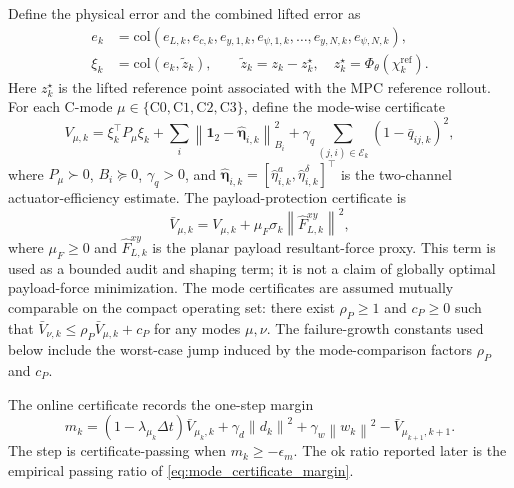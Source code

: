 \documentclass[twocolumn,3p,times,procedia]{elsarticle}
\newcommand{\norm}[1]{\left\lVert #1 \right\rVert}
\begin{document}
Define the physical error and the combined lifted error as
\begin{equation}
\begin{aligned}
e_k&=\mathrm{col}\left(e_{L,k},e_{c,k},e_{y,1,k},e_{\psi,1,k},\ldots,e_{y,N,k},e_{\psi,N,k}\right),\\
\xi_k&=\mathrm{col}\left(e_k,\tilde z_k\right),
\qquad
\tilde z_k=z_k-z_k^\star,\quad
z_k^\star=\Phi_\theta(\chi_k^{\mathrm{ref}}).
\end{aligned}
\label{eq:xi_def}
\end{equation}
Here $z_k^\star$ is the lifted reference point associated with the MPC reference rollout. For each C-mode $\mu\in\{\mathrm{C0},\mathrm{C1},\mathrm{C2},\mathrm{C3}\}$, define the mode-wise certificate
\begin{equation}
V_{\mu,k}=\xi_k^\top P_\mu\xi_k+
\sum_i\norm{\mathbf 1_2-\hat{\boldsymbol\eta}_{i,k}}_{B_i}^2+
\gamma_q\sum_{(j,i)\in\mathcal E_k}(1-\bar q_{ij,k})^2 ,
\label{eq:lyapunov}
\end{equation}
where $P_\mu\succ0$, $B_i\succeq0$, $\gamma_q>0$, and
$\hat{\boldsymbol\eta}_{i,k}=[\hat\eta^a_{i,k},\hat\eta^\delta_{i,k}]^\top$ is the two-channel actuator-efficiency estimate. The payload-protection certificate is
\begin{equation}
\bar V_{\mu,k}=V_{\mu,k}+\mu_F\sigma_k\norm{\hat F_{L,k}^{xy}}^2 ,
\label{eq:augmented_lyapunov}
\end{equation}
where $\mu_F\ge0$ and $\hat F_{L,k}^{xy}$ is the planar payload resultant-force proxy. This term is used as a bounded audit and shaping term; it is not a claim of globally optimal payload-force minimization. The mode certificates are assumed mutually comparable on the compact operating set: there exist $\rho_P\ge1$ and $c_P\ge0$ such that
$\bar V_{\nu,k}\le \rho_P\bar V_{\mu,k}+c_P$ for any modes $\mu,\nu$.
The failure-growth constants used below include the worst-case jump induced by the mode-comparison factors $\rho_P$ and $c_P$.

The online certificate records the one-step margin
\begin{equation}
m_k=(1-\lambda_{\mu_k}\Delta t)\bar V_{\mu_k,k}
+\gamma_d\norm{d_k}^2+\gamma_w\norm{w_k}^2
-\bar V_{\mu_{k+1},k+1}.
\label{eq:mode_certificate_margin}
\end{equation}
The step is certificate-passing when $m_k\ge-\epsilon_m$. The ok ratio reported later is the empirical passing ratio of \eqref{eq:mode_certificate_margin}.
\end{document}
